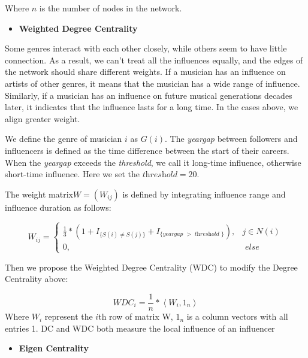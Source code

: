 \documentclass[12pt]{article}  %
\begin{document}
	Where $ n $ is the number of nodes in the network.
	
	\begin{itemize}
		\item  \textbf{Weighted Degree Centrality}
	\end{itemize}
	
	Some genres interact with each other closely, while others seem to have little connection. As a result, we can’t treat all the influences equally, and the edges of the network should share different weights. If a musician has an influence on artists of other genres, it means that the musician has a wide range of influence. Similarly, if a musician has an influence on future musical generations decades later, it indicates that the influence lasts for a long time. In the cases above, we align greater weight. 
	
	We define the genre of musician $ i $ as $ G(i) $. The \textit{yeargap} between followers and influencers is defined as the time difference between the start of their careers. When the \textit{yeargap} exceeds the \textit{threshold}, we call it long-time influence, otherwise short-time influence. Here we set the $ \textit{threshold} = 20$. 
	
	The weight matrix$  W = (W_{ij}) $ is defined by integrating influence range and influence duration as follows:
	
	\begin{equation}\label{eq:wij}
		W_{i j}=\left\{\begin{array}{cc}
			\frac{1}{3} *\left(1+I_{\{S(i) \neq S(j)\}}+I_{\{\textit {yeargap }>\textit { threshold }\}}\right), & j \in N(i) \\
			0, & \textit { else }
		\end{array}\right.
	\end{equation}
	
	Then we propose the Weighted Degree Centrality (WDC) to modify the Degree Centrality above:
	
	\begin{equation}\label{eq:wdci}
		WDC_{i}=\frac{1}{n} *\left\langle W_{i}, 1_{n}\right\rangle
	\end{equation}
	Where $ W_{i} $ represent the $ i $th row of matrix W, $ 1_n $ is a column vectors with all entries 1. DC and WDC both measure the local influence of an influencer
	
	\begin{itemize}
		\item \textbf{Eigen Centrality} 
	\end{itemize}
	
\end{document}
